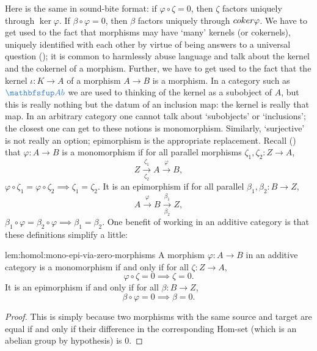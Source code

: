 Here is the same in sound-bite format: if $\varphi \circ \zeta = 0$,
then $\zeta$ factors uniquely through $\ker\varphi$. If
$\beta \circ \varphi = 0$, then $\beta$ factors uniquely through
$coker\varphi$.  We have to get used to the fact that morphisms may
have `many' kernels (or cokernels), uniquely identified with each
other by virtue of being answers to a universal question
(); it is common to harmlessly
abuse language and talk about the kernel and the cokernel of a
morphism. Further, we have to get used to the fact that the kernel
$\iota : K \to A$ of a morphism $A \to B$ is a morphism. In a category
such as $\categ{Ab}$ we are used to thinking of the kernel as a
subobject of $A$, but this is really nothing but the datum of an
inclusion map: the kernel is really that map. In an arbitrary category
one cannot talk about `subobjects' or `inclusions'; the closest one
can get to these notions is monomorphism. Similarly, `surjective' is
not really an option; epimorphism is the appropriate
replacement. Recall
()
that $\varphi : A \to B$ is a monomorphism if for all parallel
morphisms $\zeta_1, \zeta_2 : Z \to A$,
\[
  Z \xrightarrow[\zeta_2]{\zeta_1} A \xrightarrow{\varphi} B,
\]
$\varphi \circ \zeta_1 = \varphi \circ \zeta_2 \implies \zeta_1 =
\zeta_2$. It is an epimorphism if for all parallel
$\beta_1, \beta_2 : B \to Z$,
\[
  A \xrightarrow{\varphi} B \xrightarrow[\beta_2]{\beta_1} Z,
\]
$\beta_1 \circ \varphi = \beta_2 \circ \varphi \implies \beta_1 =
\beta_2$. One benefit of working in an additive category is that these
definitions simplify a little:
\begin{lem}{}{lem:homol:mono-epi-via-zero-morphisms}
  A morphism $\varphi : A \to B$ in an additive category is a
  monomorphism if and only if for all $\zeta : Z \to A$,
  \[
    \varphi \circ \zeta = 0 \implies \zeta = 0.
  \]
  It is an epimorphism if and only if for all $\beta : B \to Z$,
  \[
    \beta \circ \varphi = 0 \implies \beta = 0.
  \]
\end{lem}
\begin{proof}
  This is simply because two morphisms with the same source and target
  are equal if and only if their difference in the corresponding
  Hom-set (which is an abelian group by hypothesis) is $0$.
\end{proof}

